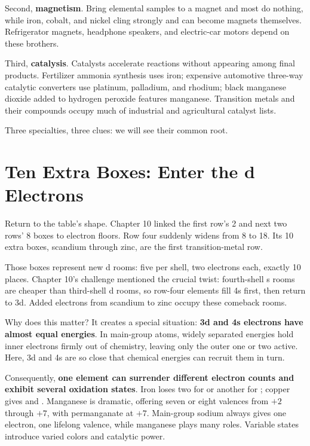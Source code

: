 Second, \textbf{magnetism}. Bring elemental samples to a magnet and most do nothing, while iron, cobalt, and nickel cling strongly and can become magnets themselves. Refrigerator magnets, headphone speakers, and electric-car motors depend on these brothers.

Third, \textbf{catalysis}. Catalysts accelerate reactions without appearing among final products. Fertilizer ammonia synthesis uses iron; expensive automotive three-way catalytic converters use platinum, palladium, and rhodium; black manganese dioxide added to hydrogen peroxide features manganese. Transition metals and their compounds occupy much of industrial and agricultural catalyst lists.

Three specialties, three clues: we will see their common root.

\section{Ten Extra Boxes: Enter the d Electrons}

Return to the table's shape. Chapter 10 linked the first row's 2 and next two rows' 8 boxes to electron floors. Row four suddenly widens from 8 to 18. Its 10 extra boxes, scandium through zinc, are the first transition-metal row.

Those boxes represent new d rooms: five per shell, two electrons each, exactly 10 places. Chapter 10's challenge mentioned the crucial twist: fourth-shell s rooms are cheaper than third-shell d rooms, so row-four elements fill 4s first, then return to 3d. Added electrons from scandium to zinc occupy these comeback rooms.

Why does this matter? It creates a special situation: \textbf{3d and 4s electrons have almost equal energies}. In main-group atoms, widely separated energies hold inner electrons firmly out of chemistry, leaving only the outer one or two active. Here, 3d and 4s are so close that chemical energies can recruit them in turn.

Consequently, \textbf{one element can surrender different electron counts and exhibit several oxidation states}. Iron loses two for  or another for ; copper gives  and . Manganese is dramatic, offering seven or eight valences from $+2$ through $+7$, with permanganate  at $+7$. Main-group sodium always gives one electron, one lifelong valence, while manganese plays many roles. Variable states introduce varied colors and catalytic power.

